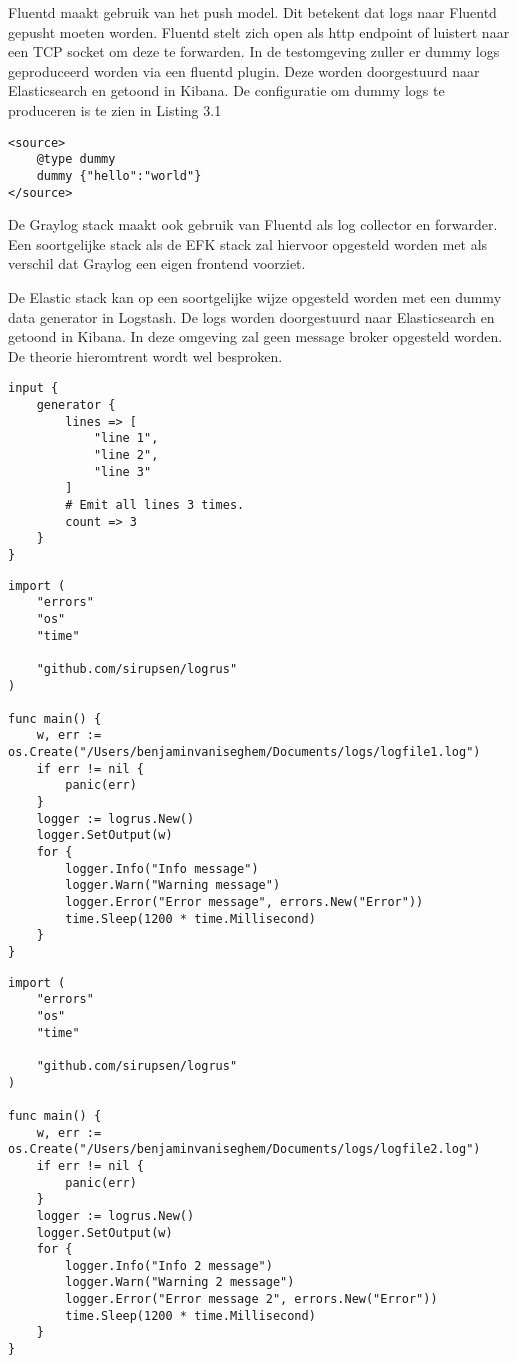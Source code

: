 Fluentd maakt gebruik van het push model. Dit betekent dat logs naar Fluentd gepusht moeten worden. Fluentd stelt zich open als http endpoint of luistert naar een TCP socket om deze te forwarden. In de testomgeving zuller er dummy logs geproduceerd worden via een fluentd plugin. Deze worden doorgestuurd naar Elasticsearch en getoond in Kibana. De configuratie om dummy logs te produceren is te zien in Listing 3.1

\begin{lstlisting}[caption=Fluentd dummy log generator]
<source>
    @type dummy
    dummy {"hello":"world"}
</source>
\end{lstlisting}

De Graylog stack maakt ook gebruik van Fluentd als log collector en forwarder. Een soortgelijke stack als de EFK stack zal hiervoor opgesteld worden met als verschil dat Graylog een eigen frontend voorziet. 

De Elastic stack kan op een soortgelijke wijze opgesteld worden met een dummy data generator in Logstash. De logs worden doorgestuurd naar Elasticsearch en getoond in Kibana. In deze omgeving zal geen message broker opgesteld worden. De theorie hieromtrent wordt wel besproken.

\begin{lstlisting}[caption=Logstash dummy log generator]
input {
    generator {
        lines => [
            "line 1",
            "line 2",
            "line 3"
        ]
        # Emit all lines 3 times.
        count => 3
    }
}
\end{lstlisting}

\begin{lstlisting}[caption=Log generator main function]
import (
    "errors"
    "os"
    "time"
    
    "github.com/sirupsen/logrus"
)

func main() {
    w, err := os.Create("/Users/benjaminvaniseghem/Documents/logs/logfile1.log")
    if err != nil {
        panic(err)
    }
    logger := logrus.New()
    logger.SetOutput(w)
    for {
        logger.Info("Info message")
        logger.Warn("Warning message")
        logger.Error("Error message", errors.New("Error"))
        time.Sleep(1200 * time.Millisecond)
    }
}
\end{lstlisting}

\begin{lstlisting}[caption=Log generator 2 main function ]
import (
    "errors"
    "os"
    "time"
    
    "github.com/sirupsen/logrus"
)

func main() {
    w, err := os.Create("/Users/benjaminvaniseghem/Documents/logs/logfile2.log")
    if err != nil {
        panic(err)
    }
    logger := logrus.New()
    logger.SetOutput(w)
    for {
        logger.Info("Info 2 message")
        logger.Warn("Warning 2 message")
        logger.Error("Error message 2", errors.New("Error"))
        time.Sleep(1200 * time.Millisecond)
    }
}
\end{lstlisting}

